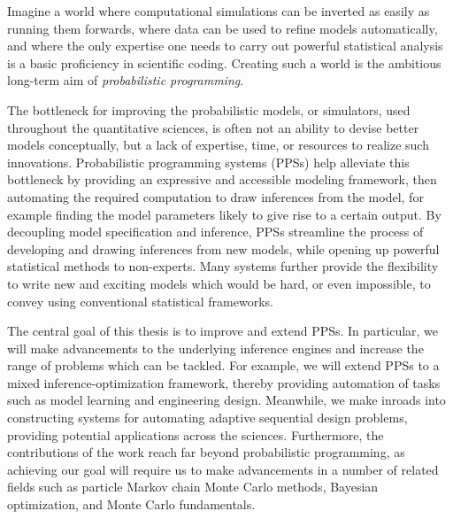
\vspace{20pt}
Imagine a world where computational simulations can be inverted as easily as running them forwards, where data
can be used to refine models automatically, and where the only expertise one needs to carry
out powerful statistical analysis is a basic proficiency in scientific coding.  Creating such a
world is the ambitious long-term aim of \emph{probabilistic programming}.

The bottleneck for improving the probabilistic models, or simulators, used throughout the quantitative sciences,
is often not an ability to devise better models conceptually,  but a lack of expertise,
time, or resources to realize such innovations.
Probabilistic programming systems (PPSs) help alleviate this bottleneck 
by providing an expressive and accessible modeling framework,
 then
automating the required computation to draw inferences from the model, for example finding
the model parameters likely to give rise to a certain output.
By decoupling model specification and inference, PPSs 
streamline the process of developing and drawing inferences from new models, while
opening up powerful statistical methods to non-experts.
Many systems further provide
the flexibility to write new and exciting models which would be hard, or even impossible, to convey using 
conventional statistical frameworks.

The central goal of this thesis is to improve and extend PPSs.
In particular, we will
make advancements to the underlying inference engines and increase the
range of problems which can be tackled.  For example, we will extend PPSs to a mixed inference-optimization
framework, thereby providing automation of tasks
such as model learning and engineering design.  Meanwhile, we make inroads into constructing systems
for automating adaptive sequential design problems, providing potential applications across the sciences.
Furthermore, the contributions of the work reach far beyond probabilistic programming, as 
achieving our goal will require us to make
advancements in a number of related fields such as particle Markov chain Monte Carlo methods,
Bayesian optimization, and Monte Carlo fundamentals. %

